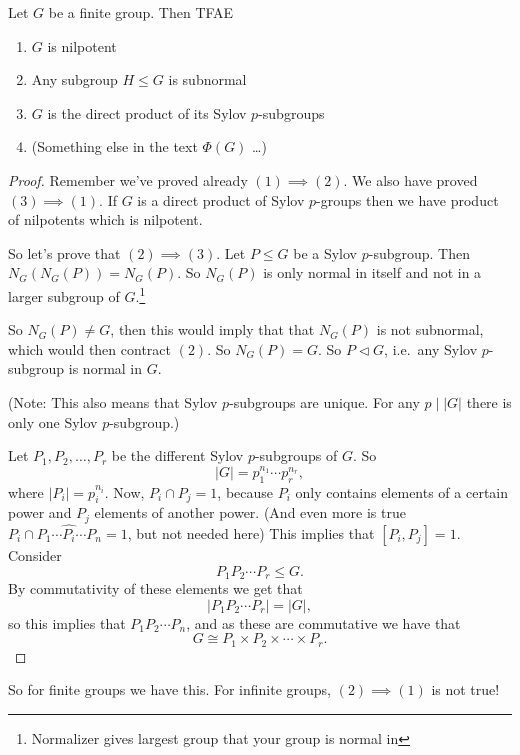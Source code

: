 \begin{theorem}[17.1.4]
    Let $G$ be a finite group. Then TFAE
    \begin{enumerate}[(1)]
        \item $G$ is nilpotent
        \item Any subgroup $H \le G$ is subnormal
        \item  $G$ is the direct product of its Sylov $p$-subgroups
        \item (Something else in the text $\Phi(G)$ \ldots)
    \end{enumerate}
\end{theorem}
\begin{proof}
    Remember we've proved already $(1) \implies(2)$.
    We also have proved $(3) \implies (1)$.
    If $G$ is a direct product of Sylov $p$-groups then we have product of nilpotents which is nilpotent.

    So let's prove that $(2) \implies (3)$.
    Let $P \le G$ be a Sylov $p$-subgroup.
    Then $N_G(N_G(P)) = N_G(P)$.
    So  $N_G(P)$ is only normal in itself and not in a larger subgroup of $G$.\footnote{Normalizer gives largest group that your group is normal in}

    So $N_G(P) \neq G$, then this would imply that that  $N_G(P)$ is not subnormal, which would then contract $(2)$.
    So $N_G(P)  = G$. So $P \triangleleft G$, i.e.\ any Sylov $p$-subgroup is normal in $G$.

    (Note: This also means that Sylov $p$-subgroups are unique. For any $p  \mid  |G|$ there is only one Sylov $p$-subgroup.)

    Let $ P_1, P_2, \ldots, P_r$ be the different Sylov $p$-subgroups of $G$.
    So
    \[
    |G| = p_1^{n_1} \cdots p_r^{n_r}
    ,\] 
    where $|P_i| = p_i^{n_i}$.
    Now, $P_i \cap P_j = 1$, because $P_i$ only contains elements of a certain power and  $P_j$ elements of another power.
    (And even more is true  $P_i \cap P_1 \cdots \hat{P_i} \cdots P_n = 1$, but not needed here)
    This implies that $[P_i, P_j] = 1$.
    Consider
    \[
    P_1 P_2 \cdots P_r \le G
    .\] 
    By commutativity of these elements we get that
    \[
    |P_1 P_2 \cdots P_r| = |G|
    ,\] 
    so this implies that $ P_1 P_2 \cdots P_n$,
    and as these are commutative we have that 
    \[
    G \cong P_1 \times P_2 \times \cdots  \times P_r
    .\] 
\end{proof}

\begin{remark}
    So for finite groups we have this.
    For infinite groups, $(2) \implies (1)$ is not true!
\end{remark}

